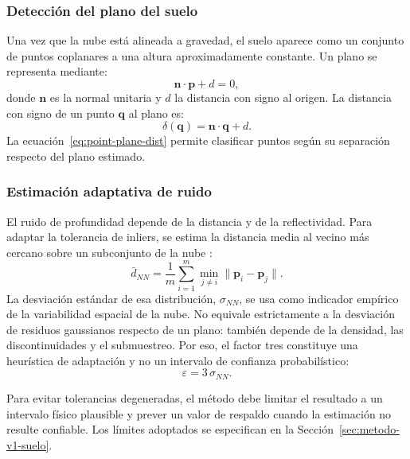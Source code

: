 \subsubsection{Detección del plano del suelo}

Una vez que la nube está alineada a gravedad, el suelo aparece como un conjunto de puntos
coplanares a una altura aproximadamente constante. Un plano se representa mediante:
\begin{equation}
  \mathbf{n}\cdot\mathbf{p}+d=0,
  \label{eq:plane-implicit}
\end{equation}
donde $\mathbf{n}$ es la normal unitaria y $d$ la distancia con signo al origen. La distancia
con signo de un punto $\mathbf{q}$ al plano es:
\begin{equation}
  \delta(\mathbf{q}) = \mathbf{n}\cdot\mathbf{q}+d.
  \label{eq:point-plane-dist}
\end{equation}
La ecuación~\ref{eq:point-plane-dist} permite clasificar puntos según su separación respecto
del plano estimado.

\subsubsection{Estimación adaptativa de ruido}

El ruido de profundidad depende de la distancia y de la reflectividad. Para adaptar la
tolerancia de inliers, se estima la distancia media al vecino más cercano sobre un subconjunto
de la nube
\cite{gonzalez2018digital}:
\begin{equation}
  \bar{d}_{NN} =
  \frac{1}{m}\sum_{i=1}^{m}\min_{j\neq i}\lVert\mathbf{p}_i-\mathbf{p}_j\rVert.
  \label{eq:nn-dist}
\end{equation}
La desviación estándar de esa distribución, $\sigma_{NN}$, se usa como indicador empírico de
la variabilidad espacial de la nube. No equivale estrictamente a la desviación de residuos
gaussianos respecto de un plano: también depende de la densidad, las discontinuidades y el
submuestreo. Por eso, el factor tres constituye una heurística de adaptación y no un intervalo
de confianza probabilístico:
\begin{equation}
  \varepsilon = 3\,\sigma_{NN}.
  \label{eq:adaptive-tol}
\end{equation}

Para evitar tolerancias degeneradas, el método debe limitar el resultado a un intervalo físico
plausible y prever un valor de respaldo cuando la estimación no resulte confiable. Los límites
adoptados se especifican en la Sección~\ref{sec:metodo-v1-suelo}.

